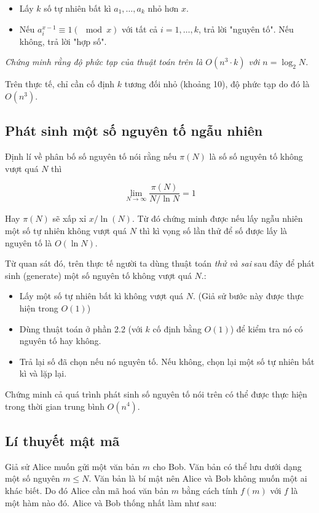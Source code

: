 \documentclass{article}
\begin{document}
\begin{itemize}
    \item Lấy $k$ số tự nhiên bất kì $a_1, \ldots, a_k$ nhỏ hơn $x$.
    \item Nếu $a_i^{x-1} \equiv 1 (\mod x)$ với tất cả $i = 1, \ldots, k$, trả lời "nguyên tố". Nếu không, trả lời "hợp số".
\end{itemize}

\textit{Chứng minh rằng độ phức tạp của thuật toán trên là $O(n^3\cdot k)$ với $n = \log_2 N$. }

Trên thực tế, chỉ cần cố định $k$ tương đối nhỏ (khoảng 10), độ phức tạp do đó là $O(n^3)$.

\subsection{Phát sinh một số nguyên tố ngẫu nhiên}
Định lí về phân bố số nguyên tố nói rằng nếu $\pi(N)$ là số số nguyên tố không vượt quá $N$ thì

$$
\lim\limits_{N\to \infty} \frac{\pi(N)}{N/\ln N} = 1 
$$

Hay $\pi(N)$ sẽ xấp xỉ $x/\ln(N)$. Từ đó chứng minh được nếu lấy ngẫu nhiên một số tự nhiên không vượt quá $N$ thì kì vọng số lần thử để số được lấy là nguyên tố là $O(\ln N)$.

Từ quan sát đó, trên thực tế người ta dùng thuật toán \textit{thử và sai} sau đây để phát sinh (generate) một số nguyên tố không vượt quá $N$.:

\begin{itemize}
    \item Lấy một số tự nhiên bất kì không vượt quá $N$. (Giả sử bước này được thực hiện trong $O(1)$)
    \item Dùng thuật toán ở phần 2.2 (với $k$ cố định bằng $O(1)$) để kiểm tra nó có nguyên tố hay không. 
    \item Trả lại số đã chọn nếu nó nguyên tố. Nếu không, chọn lại một số tự nhiên bất kì và lặp lại.
\end{itemize}

\begin{em}
    Chứng minh cả quá trình phát sinh số nguyên tố nói trên có thể được thực hiện trong thời gian trung bình $O(n^4)$.
\end{em}

\subsection{Lí thuyết mật mã}
Giả sử Alice muốn gửi một văn bản $m$ cho Bob. Văn bản có thể lưu dưới dạng một số nguyên $m \leq N$. Văn bản là bí mật nên Alice và Bob không muốn một ai khác biết. Do đó Alice cần mã hoá văn bản $m$ bằng cách tính $f(m)$ với $f$ là một hàm nào đó. Alice và Bob thống nhất làm như sau:
\end{document}
